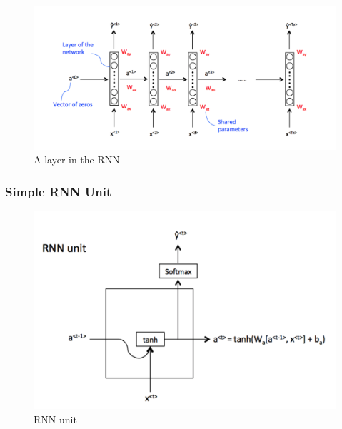 \begin{figure}
    \centering
    \includegraphics[height=0.2\paperheight]{Figures/rnn_simple.png}
    \caption[Structure of an RNN]{A layer in the RNN\cite{cavaioni_deeplearning_2018}}
    \label{fig:rnn_cell}
\end{figure}

\subsubsection{Simple RNN Unit}

\begin{figure}
    \centering
    \includegraphics[height=0.2\paperheight]{Figures/RNN_unit.png}
    \caption[An RNN Unit]{RNN unit\cite{cavaioni_deeplearning_2018}}
    \label{fig:rnn_unit}
\end{figure}

